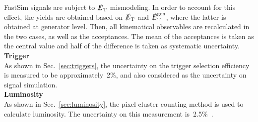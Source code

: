 FastSim signals are subject to $\slashed{E}_{\rm T}$ mismodeling. In order to account for this effect, the yields are obtained based on $\slashed{E}_{\rm T}$ and $\slashed{E}_{\rm T}^{\rm gen}$, where the latter is obtained at generator level. Then, all kinematical observables are recalculated in the two cases, as well as the acceptances. The mean of the acceptances is taken as the central value and half of the difference is taken as systematic uncertainty. \\
\textbf{Trigger}\\
As shown in Sec.~\ref{sec:triggers}, the uncertainty on the trigger selection efficiency is measured to be approximately~2\%, and also considered as the uncertainty on signal simulation. \\
\textbf{Luminosity}\\
As shown in Sec.~\ref{sec:luminosity},  the pixel cluster counting method \cite{LUMTECH} is used to calculate luminosity. The uncertainty on this measurement is~2.5\%~\cite{lumi1}.\\
